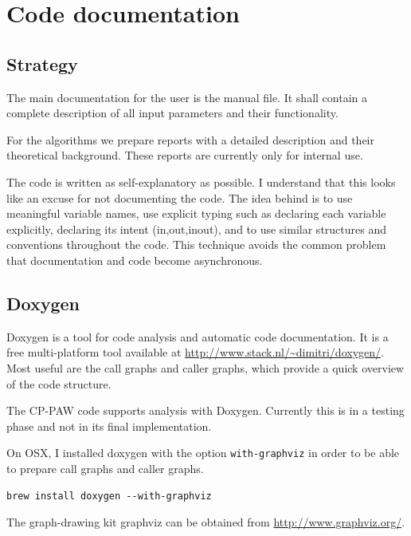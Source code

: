 \documentclass[final,12pt,makeidx,DIV=calc]{article}
\begin{document}
{{{\section{Code documentation}
\subsection{Strategy}
The main documentation for the user is the manual file. It shall
contain a complete description of all input parameters and their
functionality.

For the algorithms we prepare reports with a detailed description and
their theoretical background. These reports are currently only for
internal use. 

The code is written as self-explanatory as possible. I understand that
this looks like an excuse for not documenting the code. The idea
behind is to use meaningful variable names, use explicit typing such
as declaring each variable explicitly, declaring its intent
(in,out,inout), and to use similar structures and conventions
throughout the code. This technique avoids the common problem that
documentation and code become asynchronous.

\subsection{Doxygen}
Doxygen is a tool for code analysis and automatic code
documentation. It is a free multi-platform tool available at
\url{http://www.stack.nl/~dimitri/doxygen/}. Most useful are the call
graphs and caller graphs, which provide a quick overview of the code
structure.

The CP-PAW code supports analysis with Doxygen. Currently this is in a
testing phase and not in its final implementation. 

On OSX, I installed doxygen with the option \verb|with-graphviz| in
order to be able to prepare call graphs and caller graphs. 
\begin{verbatim} 
brew install doxygen --with-graphviz
\end{verbatim}
The graph-drawing kit graphviz can be obtained from
\url{http://www.graphviz.org/}.

}}}
\end{document}
